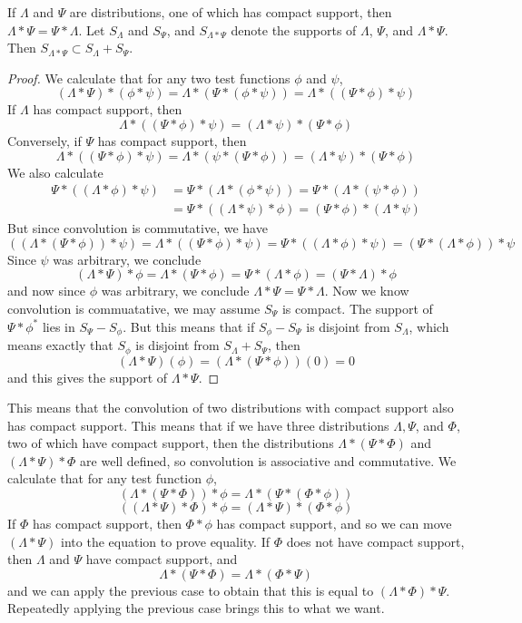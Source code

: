 \begin{theorem}
    If $\Lambda$ and $\Psi$ are distributions, one of which has compact support, then $\Lambda * \Psi = \Psi * \Lambda$. Let $S_\Lambda$ and $S_\Psi$, and $S_{\Lambda * \Psi}$ denote the supports of $\Lambda$, $\Psi$, and $\Lambda * \Psi$. Then $S_{\Lambda * \Psi} \subset S_\Lambda + S_\Psi$.
\end{theorem}
\begin{proof}
    We calculate that for any two test functions $\phi$ and $\psi$,
    \[ (\Lambda * \Psi) * (\phi * \psi) = \Lambda * (\Psi * (\phi * \psi)) = \Lambda * ((\Psi * \phi) * \psi) \]
    If $\Lambda$ has compact support, then
    \[ \Lambda * ((\Psi * \phi) * \psi) = (\Lambda * \psi) * (\Psi * \phi) \]
    Conversely, if $\Psi$ has compact support, then
    \[ \Lambda * ((\Psi * \phi) * \psi) = \Lambda * (\psi * (\Psi * \phi)) = (\Lambda * \psi) * (\Psi * \phi) \]
    We also calculate
    \begin{align*}
        \Psi * ((\Lambda * \phi) * \psi) &= \Psi * (\Lambda * (\phi * \psi)) = \Psi * (\Lambda * (\psi * \phi))\\
        &= \Psi * ((\Lambda * \psi) * \phi) = (\Psi * \phi) * (\Lambda * \psi)
    \end{align*}
    But since convolution is commutative, we have
    \[ ((\Lambda * (\Psi * \phi)) * \psi) = \Lambda * ((\Psi * \phi) * \psi) = \Psi * ((\Lambda * \phi) * \psi) = (\Psi * (\Lambda * \phi)) * \psi \]
    Since $\psi$ was arbitrary, we conclude
    \[ (\Lambda * \Psi) * \phi = \Lambda * (\Psi * \phi) = \Psi * (\Lambda * \phi) = (\Psi * \Lambda) * \phi \]
    and now since $\phi$ was arbitrary, we conclude $\Lambda * \Psi = \Psi * \Lambda$. Now we know convolution is commuatative, we may assume $S_\Psi$ is compact. The support of $\Psi * \phi^*$ lies in $S_\Psi - S_\phi$. But this means that if $S_\phi - S_\Psi$ is disjoint from $S_\Lambda$, which means exactly that $S_\phi$ is disjoint from $S_\Lambda + S_\Psi$, then
    \[ (\Lambda * \Psi)(\phi) = (\Lambda * (\Psi * \phi))(0) = 0 \]
    and this gives the support of $\Lambda * \Psi$.
\end{proof}

This means that the convolution of two distributions with compact support also has compact support. This means that if we have three distributions $\Lambda, \Psi$, and $\Phi$, two of which have compact support, then the distributions $\Lambda * (\Psi * \Phi)$ and $(\Lambda * \Psi) * \Phi$ are well defined, so convolution is associative and commutative. We calculate that for any test function $\phi$,
%
\[ (\Lambda * (\Psi * \Phi)) * \phi = \Lambda * (\Psi * (\Phi * \phi)) \]
\[ ((\Lambda * \Psi) * \Phi) * \phi = (\Lambda * \Psi) * (\Phi * \phi) \]
%
If $\Phi$ has compact support, then $\Phi * \phi$ has compact support, and so we can move $(\Lambda * \Psi)$ into the equation to prove equality. If $\Phi$ does not have compact support, then $\Lambda$ and $\Psi$ have compact support, and
%
\[ \Lambda * (\Psi * \Phi) = \Lambda * (\Phi * \Psi) \]
%
and we can apply the previous case to obtain that this is equal to $(\Lambda * \Phi) * \Psi$. Repeatedly applying the previous case brings this to what we want.

